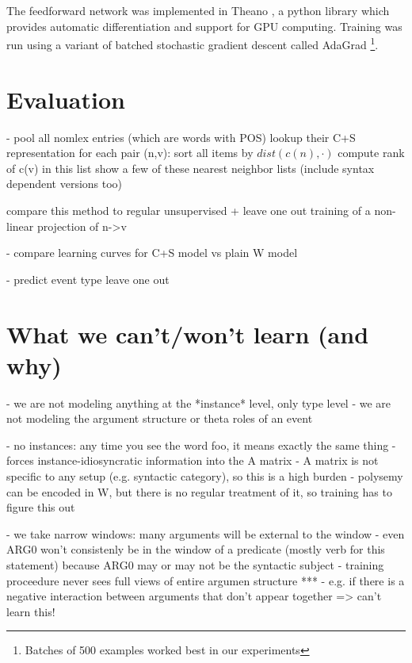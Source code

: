 \documentclass[11pt,letterpaper]{article}
\begin{document}
The feedforward network was implemented in Theano \cite{theano},
a python library which provides automatic differentiation and support for GPU computing.
Training was run using a variant of batched stochastic gradient descent called AdaGrad \cite{adagrad}
\footnote{Batches of 500 examples worked best in our experiments}.









\section{Evaluation} %
- pool all nomlex entries (which are words with POS)
	lookup their C+S representation
	for each pair (n,v):
		sort all items by $dist(c(n), \cdot)$
		compute rank of c(v) in this list
	show a few of these nearest neighbor lists (include syntax dependent versions too)

	compare this method to regular unsupervised + leave one out training of a non-linear projection of n->v

- compare learning curves for C+S model vs plain W model

- predict event type leave one out




\section{What we can't/won't learn (and why)} %
\label{section:unlearnability}
- we are not modeling anything at the *instance* level, only type level
- we are not modeling the argument structure or theta roles of an event

- no instances: any time you see the word foo, it means exactly the same thing
	- forces instance-idiosyncratic information into the A matrix
	- A matrix is not specific to any setup (e.g. syntactic category), so this is a high burden
	- polysemy can be encoded in W, but there is no regular treatment of it, so training has to figure this out

- we take narrow windows: many arguments will be external to the window
	- even ARG0 won't consistenly be in the window of a predicate (mostly verb for this statement)
		because ARG0 may or may not be the syntactic subject
	- training proceedure never sees full views of entire argumen structure
	***	- e.g. if there is a negative interaction between arguments that don't appear together => can't learn this!
\end{document}
